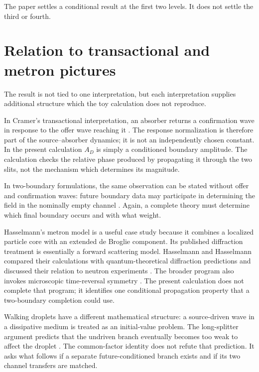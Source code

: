 \documentclass[11pt]{article}
\begin{document}
The paper settles a conditional result at the first two levels.  It does not settle the third or fourth.

\section{Relation to transactional and metron pictures}

The result is not tied to one interpretation, but each interpretation supplies additional structure which the toy calculation does not reproduce.

In Cramer's transactional interpretation, an absorber returns a confirmation wave in response to the offer wave reaching it \cite{Cramer1986}.  The response normalization is therefore part of the source--absorber dynamics; it is not an independently chosen constant.  In the present calculation $A_D$ is simply a conditioned boundary amplitude.  The calculation checks the relative phase produced by propagating it through the two slits, not the mechanism which determines its magnitude.

In two-boundary formulations, the same observation can be stated without offer and confirmation waves: future boundary data may participate in determining the field in the nominally empty channel \cite{Wharton2007}.  Again, a complete theory must determine which final boundary occurs and with what weight.

Hasselmann's metron model is a useful case study because it combines a localized particle core with an extended de Broglie component.  Its published diffraction treatment is essentially a forward scattering model.  Hasselmann and Hasselmann compared their calculations with quantum-theoretical diffraction predictions and discussed their relation to neutron experiments \cite{Hasselmann2004}.  The broader program also invokes microscopic time-reversal symmetry \cite{Hasselmann1998}.  The present calculation does not complete that program; it identifies one conditional propagation property that a two-boundary completion could use.

Walking droplets have a different mathematical structure: a source-driven wave in a dissipative medium is treated as an initial-value problem.  The long-splitter argument predicts that the undriven branch eventually becomes too weak to affect the droplet \cite{Andersen2015,Bohr2016}.  The common-factor identity does not refute that prediction.  It asks what follows if a separate future-conditioned branch exists and if its two channel transfers are matched.
\end{document}

